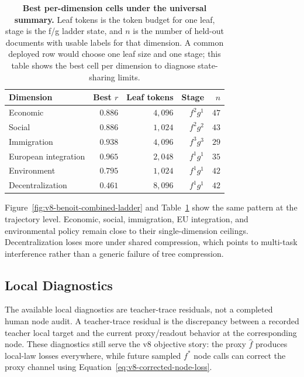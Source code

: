 \begin{table}[t]
  \centering
  \begin{tabular}{lrrrr}
    \toprule
    Dimension & Best \(r\) & Leaf tokens & Stage & \(n\) \\
    \midrule
    Economic & \(0.886\) & \(4{,}096\) & \(f^2g^1\) & \(47\) \\
    Social & \(0.886\) & \(1{,}024\) & \(f^2g^2\) & \(43\) \\
    Immigration & \(0.938\) & \(4{,}096\) & \(f^3g^3\) & \(29\) \\
    European integration & \(0.965\) & \(2{,}048\) & \(f^1g^1\) & \(35\) \\
    Environment & \(0.795\) & \(1{,}024\) & \(f^1g^1\) & \(42\) \\
    Decentralization & \(0.461\) & \(8{,}096\) & \(f^1g^1\) & \(42\) \\
    \bottomrule
  \end{tabular}
  \caption{\textbf{Best per-dimension cells under the universal summary.}
  Leaf tokens is the token budget for one leaf, stage is the f/g ladder state,
  and \(n\) is the number of held-out documents with usable labels for that
  dimension. A common deployed row would choose one leaf size and one stage;
  this table shows the best cell per dimension to diagnose state-sharing
  limits.}
  \label{tab:v8-benoit-joint-dim-best}
\end{table}

Figure~\ref{fig:v8-benoit-combined-ladder} and
Table~\ref{tab:v8-benoit-joint-dim-best} show the same pattern at the
trajectory level. Economic, social, immigration, EU integration, and
environmental policy remain close to their single-dimension ceilings.
Decentralization loses more under shared compression, which points to
multi-task interference rather than a generic failure of tree compression.

\subsection{Local Diagnostics}\label{sec:v8-benoit-local-diagnostics}

The available local diagnostics are teacher-trace residuals, not a completed
human node audit. A teacher-trace residual is the discrepancy between a
recorded teacher local target and the current proxy/readout behavior at the
corresponding node. These diagnostics still serve the v8 objective story: the
proxy \(\widehat f\) produces local-law losses everywhere, while future sampled
\(f^\ast\) node calls can correct the proxy channel using
Equation~\eqref{eq:v8-corrected-node-loss}.

